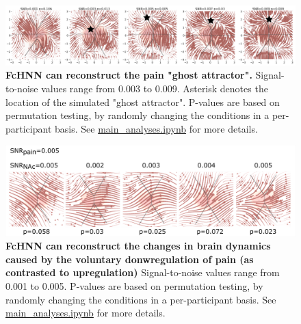 \documentclass{article}
\begin{document}
\begin{figure}[!htbp]
\centering
\includegraphics[width=0.7\linewidth]{files/si_pain_ghost_attrac-68ab60d97dade6f11669527d55a55ab1.png}
\caption[]{\textbf{FcHNN can reconstruct the pain "ghost attractor".}
Signal-to-noise values range from 0.003 to 0.009. Asterisk denotes the location of the simulated "ghost attractor". P-values are based on permutation testing, by randomly changing the conditions in a per-participant basis. See \href{https://github.com/pni-lab/connattractor/blob/master/notebooks/main\_analyses.ipynb}{main\_analyses.ipynb} for more details.}
\label{si_pain_ghost_attractor_sim}
\end{figure}

\begin{figure}[!htbp]
\centering
\includegraphics[width=0.7\linewidth]{files/si_downreg_trajector-5e4d3db6d851f7a75e01b739a152f769.png}
\caption[]{\textbf{FcHNN can reconstruct the changes in brain dynamics caused by the voluntary donwregulation of pain (as contrasted to upregulation)}
Signal-to-noise values range from 0.001 to 0.005. P-values are based on permutation testing, by randomly changing the conditions in a per-participant basis. See \href{https://github.com/pni-lab/connattractor/blob/master/notebooks/main\_analyses.ipynb}{main\_analyses.ipynb} for more details.}
\label{si_downreg_trajectory_sim}
\end{figure}
\end{document}
